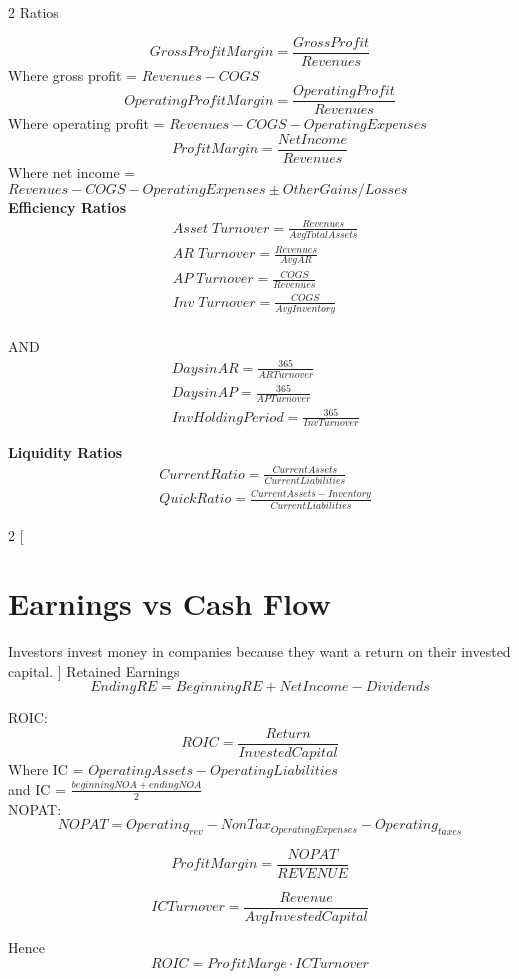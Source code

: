 \documentclass[8pt]{report}
\begin{document}
\begin{multicols}{2}
Ratios

$$
	Gross Profit Margin = \frac{Gross Profit}{Revenues}
$$
Where gross profit = $Revenues - COGS$
$$
	Operating Profit Margin = \frac{Operating Profit}{Revenues}
$$
Where operating profit = $Revenues - COGS - Operating Expenses$
$$
	Profit Margin = \frac{Net Income}{Revenues}
$$
Where net income = $Revenues - COGS - Operating Expenses \pm Other Gains/Losses$ \\


\textbf{Efficiency Ratios}
\begin{align*}
&	Asset \; Turnover = \frac{Revenues}{Avg Total Assets} \\
&	AR \; Turnover = \frac{Revenues}{Avg AR} \\ 
&	AP \; Turnover = \frac{COGS}{Revenues} \\
& 	Inv \; Turnover = \frac{COGS}{Avg Inventory} \\
\end{align*}

AND 
\begin{align*}
&	Days in AR = \frac{365}{AR Turnover} \\
& 	Days in AP = \frac{365}{AP Turnover} \\
&	Inv Holding Period = \frac{365}{Inv Turnover}
\end{align*}

\textbf{Liquidity Ratios}
\begin{align*}
&	Current Ratio = \frac{Current Assets}{Current Liabilities} \\
& 	Quick Ratio = \frac{Current Assets - Inventory}{Current Liabilities}
\end{align*}

\end{multicols}

\begin{multicols}{2}
[
\section{Earnings vs Cash Flow}
Investors invest money in companies because they want a return on their invested capital.
]
Retained Earnings
$$
	Ending RE = Beginning RE + Net Income - Dividends
$$

ROIC:
$$
	ROIC = \frac{Return}{InvestedCapital}
$$
Where IC = $OperatingAssets - OperatingLiabilities$ \\
and IC = $\frac{beginning NOA + ending NOA}{2}$ \\
NOPAT: 
$$
	NOPAT = Operating_{rev} - NonTax_{OperatingExpenses} - Operating_{taxes}
$$

$$
	Profit Margin = \frac{NOPAT}{REVENUE}
$$

$$
	ICTurnover = \frac{Revenue}{AvgInvestedCapital}
$$

Hence $$
	ROIC = ProfitMarge \cdot ICTurnover
$$
\end{multicols}
\end{document}
